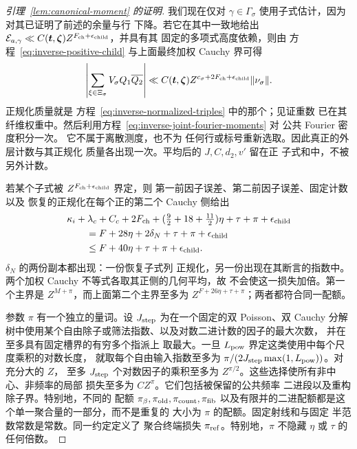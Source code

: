 \documentclass[11pt,a4paper]{article}
\numberwithin{equation}{section}
\numberwithin{figure}{section}
\theoremstyle{definition}
\theoremstyle{remark}
\begin{document}
\begin{proof}[引理~\ref{lem:canonical-moment} 的证明]
我们现在仅对
\(\gamma\in\Gamma_\sigma\) 使用子式估计，因为对其已证明了前述的余量与行
下降。若它在其中一致地给出
\(\mathcal E_{a,\gamma}\ll C(\boldsymbol t,\boldsymbol\zeta)
Z^{F_{\rm ch}+\epsilon_{\rm child}}\)，并具有其
固定的多项式高度依赖，则由
方程~\eqref{eq:inverse-positive-child} 与上面最终加权
Cauchy 界可得
\[
 \left|\sum_{\xi\in\Xi_\sigma}V_\sigma Q_1\overline{Q_2}\right|
 \ll C(\boldsymbol t,\boldsymbol\zeta)
 Z^{c_\sigma+2F_{\rm ch}+\epsilon_{\rm child}}\|\nu_\sigma\|.
\]
正规化质量就是
方程~\eqref{eq:inverse-normalized-triples} 中的那个；见证重数
已在其纤维权重中。然后利用方程~\eqref{eq:inverse-joint-fourier-moments} 对
公共 Fourier 密度积分一次。
它不属于离散测度，也不为
任何行或标号重新选取。因此真正的外层计数与其正规化
质量各出现一次。平均后的 \(J,C,d_2,v'\) 留在正
子式和中，不被另外计数。

若某个子式被 \(Z^{F_{\rm ch}+\epsilon_{\rm child}}\) 界定，则
第一前因子误差、第二前因子误差、固定计数以及
恢复的正规化在每个正的第二个 Cauchy 侧给出
\begin{equation}\label{eq:inverse-step-loss}
 \begin{split}
 &\kappa_i+\lambda_c+C_c+2F_{\rm ch}
      +(\tfrac92+18+\tfrac{11}2)\eta+\tau+\pi+\epsilon_{\rm child}\\
 &\qquad=F+28\eta+2\delta_N+\tau+\pi+\epsilon_{\rm child}\\
 &\qquad\le F+40\eta+\tau+\pi+\epsilon_{\rm child}.
 \end{split}
\end{equation}
\(\delta_N\) 的两份副本都出现：一份恢复子式列
正规化，另一份出现在其断言的指数中。两个加权
Cauchy 不等式各取其正侧的几何平均，故
不会使这一损失加倍。第一个主界是
\(Z^{M+\pi}\)，而上面第二个主界至多为
\(Z^{F+26\eta+\tau+\pi}\)；两者都符合同一配额。

参数 \(\pi\) 有一个独立的量词。设 \(J_{\rm step}\)
为在一个固定的双 Poisson、双 Cauchy
分解树中使用某个自由除子或筛法指数、以及对数二进计数的因子的最大次数，
并在至多具有固定槽界的有穷多个指派上
取最大。一旦 \(L_{\rm pow}\) 界定这类使用中每个尺度乘积的对数长度，
就取每个自由输入指数至多为
\(\pi/(2J_{\rm step}\max(1,L_{\rm pow}))\)。对充分大的 \(Z\)，
至多 \(J_{\rm step}\) 个对数因子的乘积至多为
\(Z^{\pi/2}\)。这些选择使所有非中心、非频率的局部
损失至多为 \(CZ^\pi\)。它们包括被保留的公共频率
二进段以及重构除子界。特别地，不同的
配额 \(\pi_\beta,\pi_{\rm old},\pi_{\rm count},\pi_{\rm fib}\)
以及有限并的二进配额都是这个单一聚合量的一部分，而不是重复的
大小为 \(\pi\) 的配额。固定射线和与固定
半范数常数是常数。同一约定定义了
聚合终端损失 \(\pi_{\rm ref}\)。特别地，\(\pi\) 不隐藏
\(\eta\) 或 \(\tau\) 的任何倍数。


\end{proof}
\end{document}

